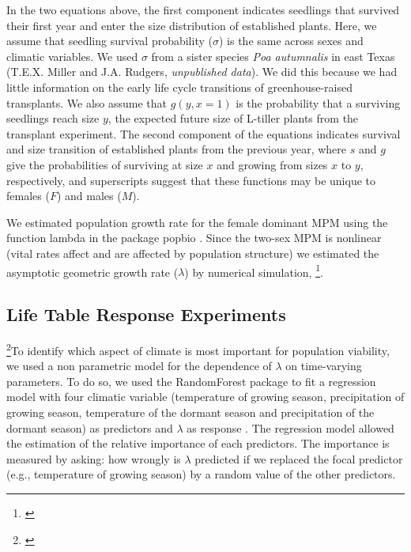 \documentclass[12pt]{article}
\newcommand{\jacob}[2]{{\color{blue}{#1}}\footnote{\textit{\color{blue}{#2}}}}
\begin{document}
\noindent In the two equations above, the first component indicates seedlings that survived their first year and enter the size distribution of established plants.
Here, we assume that seedling survival probability ($\sigma$) is the same across sexes and climatic variables.
We used $\sigma$ from a sister species \textit{Poa autumnalis} in east Texas (T.E.X. Miller and J.A. Rudgers, \textit{unpublished data}). 
We did this because we had little information on the early life cycle transitions of greenhouse-raised transplants.
We also assume that $g(y, x=1)$ is the probability that a surviving seedlings reach size $y$, the expected future size of L-tiller plants from the transplant experiment.
The second component of the equations indicates survival and size transition of established plants from the previous year, where $s$ and $g$ give the probabilities of surviving at size $x$ and growing from sizes $x$ to $y$, respectively, and superscripts suggest that these functions may be unique to females ($F$) and males ($M$).

We estimated population growth rate for the female dominant MPM using the function lambda in the package popbio \citep{popbio}. 
Since the two-sex MPM is nonlinear (vital rates affect and are affected by population structure) we estimated the asymptotic geometric growth rate ($\lambda$) by numerical simulation, \jacob{and repeated this across a range of climate}{I think the key thing here is that the estimation of lambda was not from an eigen value as opposed to the female dominant.I added an explanation of "vital rates affect and are affected by population structure" in the first paragraph}.


\subsection*{Life Table Response Experiments}
\jacob{}{I modified this section. I understand your concern about accounting for the second order term in the first LTRE but I don't think we should be worry about that here. I am saying that because the technic here is similar to an ANOVA-- we dropped one predictor to see how much the error goes up. That's why we don't account for sex or size because lambda account for them already. I will say this is an independent test.}To identify which aspect of climate is most important for population viability, we used a non parametric model for the dependence of $\lambda$ on time-varying parameters. 
To do so, we used the RandomForest package to fit a regression model with four climatic variable (temperature of growing season, precipitation of growing season, temperature of the dormant season and precipitation of the dormant season)
as predictors  and $\lambda$ as response \citep{ellner2016data,liaw2002classification}.
The regression model allowed the estimation of the relative importance of each predictors.  
The importance is measured by asking: how wrongly is $\lambda$ predicted if we replaced the focal predictor (e.g., temperature of growing season) by a random value of the other predictors.
\end{document}
